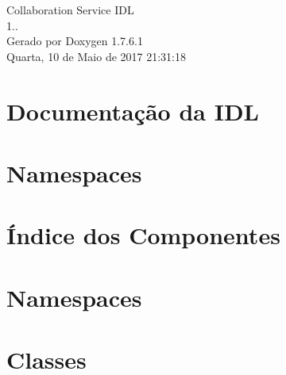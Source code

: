 \documentclass[a4paper]{book}
\begin{document}
\hypersetup{pageanchor=false,citecolor=blue}
\begin{titlepage}
\vspace*{7cm}
\begin{center}
{\Large \-Collaboration \-Service \-I\-D\-L \\[1ex]\large 1.. }\\
\vspace*{1cm}
{\large \-Gerado por Doxygen 1.7.6.1}\\
\vspace*{0.5cm}
{\small Quarta, 10 de Maio de 2017 21:31:18}\\
\end{center}
\end{titlepage}
\clearemptydoublepage
{}
\tableofcontents
\clearemptydoublepage
{}
\hypersetup{pageanchor=true,citecolor=blue}
\chapter{\-Documentação da \-I\-D\-L}
\label{index}\hypertarget{index}{}
\chapter{\-Namespaces}

\chapter{Índice dos \-Componentes}

\chapter{\-Namespaces}





\chapter{\-Classes}









\printindex
\end{document}

